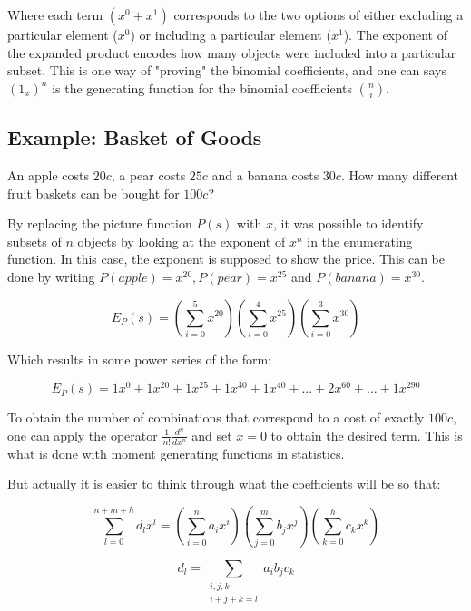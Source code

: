 Where each term $(x^0 + x^1)$ corresponds to the two options of either excluding a particular element ($x^0$) or including a particular element ($x^1$). The exponent of the expanded product encodes how many objects were included into a particular subset. This is one way of "proving" the binomial coefficients, and one can says $(1_x)^n$ is the generating function for the binomial coefficients ${n \choose i}$. 


\subsection{Example: Basket of Goods}

An apple costs $20c$, a pear costs $25c$ and a banana costs $30c$. How many different fruit baskets can be bought for $100c$?

By replacing the picture function $P(s)$ with $x$, it was possible to identify subsets of $n$ objects by looking at the exponent of $x^n$ in the enumerating function. In this case, the exponent is supposed to show the price. This can be done by writing $P(apple) = x^{20}, P(pear) = x^{25}$ and $P(banana) = x^{30}$. 

\begin{equation}
E_P(s) = \left( \sum_{i=0}^5 x^{20} \right)\left( \sum_{i=0}^4 x^{25} \right)\left( \sum_{i=0}^3 x^{30} \right)
\end{equation}

Which results in some power series of the form:

\begin{equation}
E_P(s) = 1x^0 + 1x^{20} + 1x^{25} + 1x^{30} + 1x^{40} +... + 2x^{60} + ... + 1x^{290}
\end{equation}

To obtain the number of combinations that correspond to a cost of exactly $100c$, one can apply the operator $\frac{1}{n!}\frac{d^n}{dx^n}$ and set $x=0$ to obtain the desired term. This is what is done with moment generating functions in statistics. 

But actually it is easier to think through what the coefficients will be so that:

\begin{equation}
\sum_{l=0}^{n+m+h}d_l x^l = \left(\sum_{i=0}^n a_i x^i\right)\left(\sum_{j=0}^m b_j x^j\right)\left(\sum_{k=0}^h c_k x^k\right)
\end{equation}

\begin{equation}
d_l = \sum_{\begin{array}{c}i,j,k\\i+j+k=l\end{array}} a_i b_j c_k
\end{equation}

